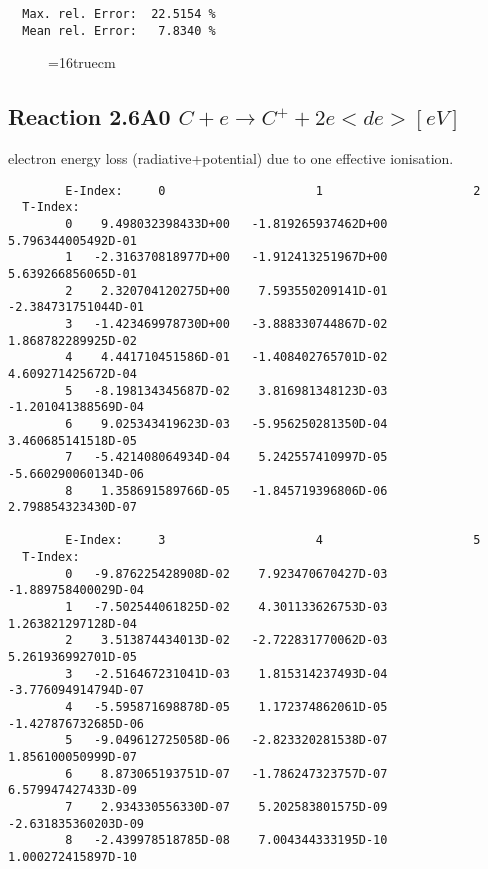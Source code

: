 \documentclass[12pt]{article}
\begin{document}
\begin{small}
\begin{verbatim}
  Max. rel. Error:  22.5154 %
  Mean rel. Error:   7.8340 %

\end{verbatim}\end{small}
\begin{figure} \label{2.3.13aec}
\epsfxsize=16truecm
\end{figure}
\newpage


\subsection{
  Reaction 2.6A0 $C  + e \rightarrow C^+   + 2e  <de> [eV] $
}

  electron energy loss (radiative+potential) due to one effective ionisation.

\begin{small}\begin{verbatim}
        E-Index:     0                     1                     2
  T-Index:
        0    9.498032398433D+00   -1.819265937462D+00    5.796344005492D-01
        1   -2.316370818977D+00   -1.912413251967D+00    5.639266856065D-01
        2    2.320704120275D+00    7.593550209141D-01   -2.384731751044D-01
        3   -1.423469978730D+00   -3.888330744867D-02    1.868782289925D-02
        4    4.441710451586D-01   -1.408402765701D-02    4.609271425672D-04
        5   -8.198134345687D-02    3.816981348123D-03   -1.201041388569D-04
        6    9.025343419623D-03   -5.956250281350D-04    3.460685141518D-05
        7   -5.421408064934D-04    5.242557410997D-05   -5.660290060134D-06
        8    1.358691589766D-05   -1.845719396806D-06    2.798854323430D-07

        E-Index:     3                     4                     5
  T-Index:
        0   -9.876225428908D-02    7.923470670427D-03   -1.889758400029D-04
        1   -7.502544061825D-02    4.301133626753D-03    1.263821297128D-04
        2    3.513874434013D-02   -2.722831770062D-03    5.261936992701D-05
        3   -2.516467231041D-03    1.815314237493D-04   -3.776094914794D-07
        4   -5.595871698878D-05    1.172374862061D-05   -1.427876732685D-06
        5   -9.049612725058D-06   -2.823320281538D-07    1.856100050999D-07
        6    8.873065193751D-07   -1.786247323757D-07    6.579947427433D-09
        7    2.934330556330D-07    5.202583801575D-09   -2.631835360203D-09
        8   -2.439978518785D-08    7.004344333195D-10    1.000272415897D-10


\end{verbatim}
\end{small}
\end{document}
